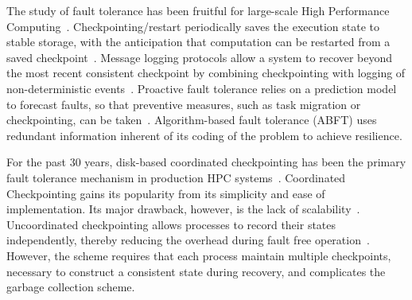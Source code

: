 
The study of fault tolerance has been fruitful for large-scale High Performance Computing~\cite{herault2015fault}. Checkpointing/restart periodically saves the execution state to stable storage, with the anticipation that
computation can be restarted from a saved checkpoint~\cite{Chandy:1985:DSD:214451.214456}. 
Message logging protocols allow a system to recover beyond the most recent consistent checkpoint by combining checkpointing with logging of non-deterministic events~\cite{Elnozahy:02:Survey}. Proactive fault tolerance relies on a prediction model to forecast faults, so that preventive measures, such as task migration or checkpointing, can be taken~\cite{gainaru2012fault}. Algorithm-based fault tolerance (ABFT) uses redundant information inherent of its coding of the problem to achieve resilience. %

For the past 30 years, disk-based coordinated checkpointing has been the primary fault tolerance mechanism in 
production HPC systems~\cite{ferreira_sc_2011}. 
Coordinated Checkpointing gains its popularity from its simplicity and ease of implementation. Its major drawback, however, is the
lack of scalability~\cite{hargrove2006berkeley}.
Uncoordinated checkpointing allows processes to record their states independently, thereby reducing the overhead during fault free operation~\cite{guermouche_2011_ipdps}. 
However, the scheme requires that
each process maintain multiple checkpoints, necessary to construct a consistent state during recovery, and complicates the garbage collection scheme. %


